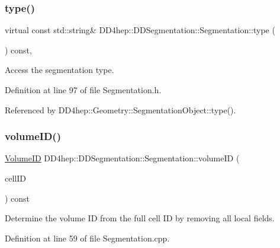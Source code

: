 \subsubsection{\texorpdfstring{type()}{type()}}
{\footnotesize\ttfamily virtual const std\+::string\& D\+D4hep\+::\+D\+D\+Segmentation\+::\+Segmentation\+::type (\begin{DoxyParamCaption}{ }\end{DoxyParamCaption}) const\hspace{0.3cm}{\ttfamily [inline]}, {\ttfamily [virtual]}}



Access the segmentation type. 



Definition at line 97 of file Segmentation.\+h.



Referenced by D\+D4hep\+::\+Geometry\+::\+Segmentation\+Object\+::type().

\hypertarget{class_d_d4hep_1_1_d_d_segmentation_1_1_segmentation_a43c0e9648e3b7cded015847c0802f757}{}\label{class_d_d4hep_1_1_d_d_segmentation_1_1_segmentation_a43c0e9648e3b7cded015847c0802f757} 
\subsubsection{\texorpdfstring{volume\+I\+D()}{volumeID()}}
{\footnotesize\ttfamily \hyperlink{namespace_d_d4hep_1_1_d_d_segmentation_a61a6833a18d1800bdef176595f83e3ba}{Volume\+ID} D\+D4hep\+::\+D\+D\+Segmentation\+::\+Segmentation\+::volume\+ID (\begin{DoxyParamCaption}\item[{const \hyperlink{namespace_d_d4hep_1_1_d_d_segmentation_ac7af071d85cb48820914434a07e21ba1}{Cell\+ID} \&}]{cell\+ID }\end{DoxyParamCaption}) const\hspace{0.3cm}{\ttfamily [virtual]}}



Determine the volume ID from the full cell ID by removing all local fields. 



Definition at line 59 of file Segmentation.\+cpp.




